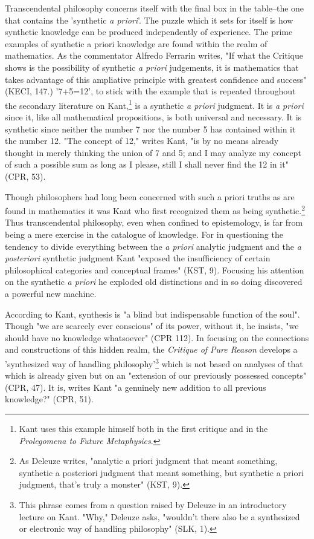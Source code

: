 Transcendental philosophy concerns itself with the final box in the table--the one that contains the 'synthetic \textit{a priori}'. The puzzle which it sets for itself is how synthetic knowledge can be produced independently of experience. The prime examples of synthetic a priori knowledge are found within the realm of mathematics. As the commentator Alfredo Ferrarin writes, "If what the Critique shows is the possibility of synthetic \textit{a priori} judgements, it is mathematics that takes advantage of this ampliative principle with greatest confidence and success" (KECI, 147.) '7+5=12', to stick with the example that is repeated throughout the secondary literature on Kant,\footnote{Kant uses this example himself both in the first critique and in the \textit{Prolegomena to Future Metaphysics}.} is a synthetic \textit{a priori} judgment. It is \textit{a priori} since it, like all mathematical propositions, is both universal and necessary. It is synthetic since neither the number 7 nor the number 5 has contained within it the number 12. "The concept of 12," writes Kant, "is by no means already thought in merely thinking the union of 7 and 5; and I may analyze my concept of such a possible sum as long as I please, still I shall never find the 12 in it" (CPR, 53).

Though philosophers had long been concerned with such a priori truths as are found in mathematics it was Kant who first recognized them as being synthetic.\footnote{As Deleuze writes, "analytic a priori judgment that meant something, synthetic a posteriori judgment that meant something, but synthetic a priori judgment, that's truly a monster" (KST, 9).} Thus transcendental philosophy, even when confined to epistemology, is far from being a mere exercise in the catalogue of knowledge. For in questioning the tendency to divide everything between the \textit{a priori} analytic judgment and the \textit{a posteriori} synthetic judgment Kant "exposed the insufficiency of certain philosophical categories and conceptual frames" (KST, 9). Focusing his attention on the synthetic \textit{a priori} he exploded old distinctions and in so doing discovered a powerful new machine. 

According to Kant, synthesis is "a blind but indispensable function of the soul". Though "we are scarcely ever conscious" of its power, without it, he insists, "we should have no knowledge whatsoever" (CPR 112). In focusing on the connections and constructions of this hidden realm, the \textit{Critique of Pure Reason} develops a 'synthesized way of handling philosophy'\footnote{This phrase comes from a question raised by Deleuze in an introductory lecture on Kant. "Why," Deleuze asks, "wouldn't there also be a synthesized or electronic way of handling philosophy" (SLK, 1).} which is not based on analyses of that which is already given but on an "extension of our previously possessed concepts" (CPR, 47). It is, writes Kant "a genuinely new addition to all previous knowledge?" (CPR, 51).

